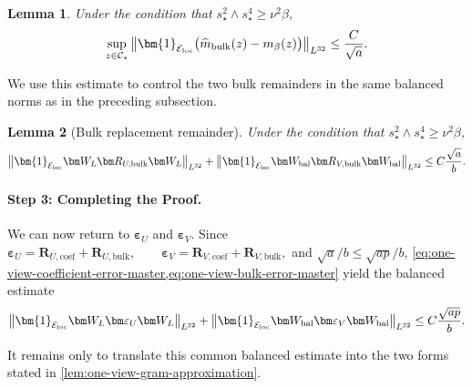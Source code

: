 \documentclass[11pt]{article}
\newtheorem{lemma}{Lemma}
\newcommand{\ind}{\bm{1}}
\newcommand{\Lqn}[2]{\left\lVert #1\right\rVert_{L^{#2}}}
\newcommand{\cE}{\mathcal{E}}
\begin{document}
\begin{lemma}
\label{lem:one-view-resolvent}
Under the condition that 
$s_\star^2\wedge s_\star^4\ge\nu^2\beta$,
\begin{equation}
\label{eq:one-view-resolvent-bound}
  \sup_{z\in\mathcal C_\star}
  \left\|
    \ind_{\cE_{\rm loc}}
    \bigl(\widehat m_{\rm bulk}(z)-m_\beta(z)\bigr)
  \right\|_{L^{32}}
  \le
  \frac{C}{\sqrt a}.
\end{equation}
\end{lemma}


We use this estimate to control the two bulk remainders in the same
balanced norms as in the preceding subsection.

\begin{lemma}[Bulk replacement remainder]
\label{lem:one-view-bulk-error}
Under the condition that 
$s_\star^2\wedge s_\star^4\ge\nu^2\beta$,
\begin{equation}
\label{eq:one-view-bulk-error-master}
  \Lqn{
    \ind_{\cE_{\rm loc}}
    \bm W_L\bm R_{U,\mathrm{bulk}}\bm W_L
  }{32}
  +
  \Lqn{
    \ind_{\cE_{\rm loc}}
    \bm W_{\rm bal}\bm R_{V,\mathrm{bulk}}\bm W_{\rm bal}
  }{32}
  \le
  C\frac{\sqrt a}{b}.
\end{equation}
\end{lemma}








\paragraph{Step 3: Completing the Proof.}

We can now return to
$\bm\varepsilon_U$ and $\bm\varepsilon_V$.
Since
\(\bm\varepsilon_U = \bm R_{U,\mathrm{coef}} + \bm R_{U,\mathrm{bulk}}, \qquad \bm\varepsilon_V = \bm R_{V,\mathrm{coef}} + \bm R_{V,\mathrm{bulk}},\)
and $\sqrt a/b\le\sqrt{ap}/b$,
\cref{eq:one-view-coefficient-error-master,eq:one-view-bulk-error-master}
yield the balanced estimate
\begin{equation}
\label{eq:one-view-balanced-master-error}
  \Lqn{
    \ind_{\cE_{\rm loc}}
    \bm W_L\bm\varepsilon_U\bm W_L
  }{32}
  +
  \Lqn{
    \ind_{\cE_{\rm loc}}
    \bm W_{\rm bal}\bm\varepsilon_V\bm W_{\rm bal}
  }{32}
  \le
  C\frac{\sqrt{ap}}b.
\end{equation}

It remains only to translate this common balanced estimate into the two
forms stated in \cref{lem:one-view-gram-approximation}.
\end{document}
